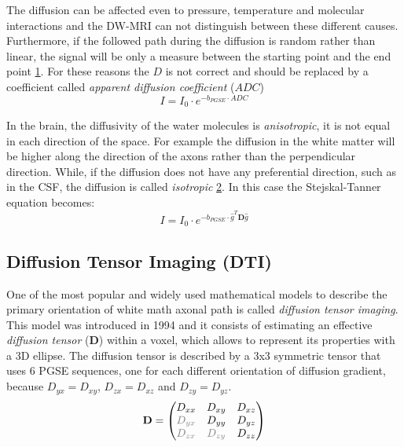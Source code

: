  The diffusion can be affected even to pressure, temperature and molecular interactions and the DW-MRI can not distinguish between these different causes. Furthermore, if the followed path during the diffusion is random rather than linear, the signal will be only a measure between the starting point and the end point \ref{fig:displacement_dMRI}. For these reasons the $D$ is not correct and should be replaced by a coefficient called \emph{apparent diffusion coefficient} ($ADC$)
 \begin{equation}
    I = I_0 \cdot e^{-b_{PGSE} \cdot ADC}
 \end{equation}

 \begin{figure}[h]
    \centering
    \caption{}
    \label{fig:displacement_dMRI}
 \end{figure}

 In the brain, the diffusivity of the water molecules is \emph{anisotropic}, it is not equal in each direction of the space. For example the diffusion in the white matter will be higher along the direction of the axons rather than the perpendicular direction. While, if the diffusion does not have any preferential direction, such as in the CSF, the diffusion is called \emph{isotropic} \ref{fig:isotropiAnisotropi}. In this case the Stejskal-Tanner equation becomes:
 \begin{equation}
    I = I_0 \cdot e^{-b_{PGSE} \cdot \hat{g}^T\mathbf{D}\hat{g}}
 \end{equation}

 \begin{figure}[h]
    \centering
    \caption{}
    \label{fig:isotropiAnisotropi}
 \end{figure}

 \subsection{Diffusion Tensor Imaging (DTI)}
 One of the most popular and widely used mathematical models to describe the primary orientation of white math axonal path is called \emph{diffusion tensor imaging}. This model was introduced in 1994 \cite{basser1994mr} and it consists of estimating an effective \emph{diffusion tensor} ($\mathbf{D}$) within a voxel, which allows to represent its properties with a 3D ellipse. The diffusion tensor is described by a 3x3 symmetric tensor that uses 6 PGSE sequences, one for each different orientation of diffusion gradient, because $D_{yx}=D_{xy}$, $D_{zx}=D_{xz}$ and $D_{zy}=D_{yz}$.
 \begin{equation}
    \mathbf{D} = 
    \begin{pmatrix}
        D_{xx} & D_{xy} & D_{xz} \\
        \textcolor{gray}{D_{yx}} & D_{yy} & D_{yz} \\
        \textcolor{gray}{D_{zx}} & \textcolor{gray}{D_{zy}} & D_{zz}
    \end{pmatrix}
 \end{equation}

